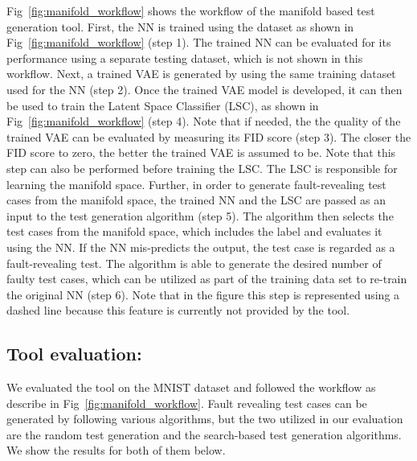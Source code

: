 Fig~\ref{fig:manifold_workflow} shows the workflow of the manifold based test generation tool. First, the NN is trained using the dataset as shown in Fig~\ref{fig:manifold_workflow} (step 1). The trained NN can be evaluated for its performance using a separate testing dataset, which is not shown in this workflow. Next, a trained VAE is generated by using the same training dataset used for the NN (step 2). Once the trained VAE model is developed, it can then be used to train the Latent Space Classifier (LSC), as shown in Fig~\ref{fig:manifold_workflow} (step 4). Note that if needed, the the quality of the trained VAE can be evaluated by measuring its FID score (step 3). The closer the FID score to zero, the better the trained VAE is assumed to be. Note that this step can also be performed before training the LSC. The LSC is responsible for learning the manifold space. Further, in order to generate fault-revealing test cases from the manifold space, the trained NN and the LSC are passed as an input to the test generation algorithm (step 5). The algorithm then selects the test cases from the manifold space, which includes the label and evaluates it using the NN. If the NN mis-predicts the output, the test case is regarded as a fault-revealing test. The algorithm is able to generate the desired number of faulty test cases, which can be utilized as part of the training data set to re-train the original NN (step 6). Note that in the figure this step is represented using a dashed line because this feature is currently not provided by the tool.

\subsection{Tool evaluation:} We evaluated the tool on the MNIST dataset and followed the workflow as describe in Fig~\ref{fig:manifold_workflow}. Fault revealing test cases can be generated by following various algorithms, but the two utilized in our evaluation are the random test generation and the search-based test generation algorithms. We show the results for both of them below. 

